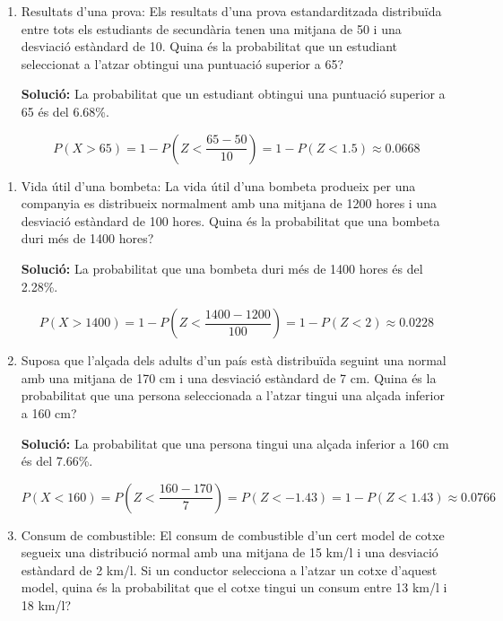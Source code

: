 \documentclass[12pt]{article}
\begin{document}
\begin{exemple} [title=]
\begin{enumerate} [start=19]
    \item Resultats d'una prova: Els resultats d'una prova estandarditzada distribuïda entre tots els estudiants de secundària tenen una mitjana de 50 i una desviació estàndard de 10. Quina és la probabilitat que un estudiant seleccionat a l'atzar obtingui una puntuació superior a 65?
    
    \textbf{Solució:} La probabilitat que un estudiant obtingui una puntuació superior a 65 és del 6.68\%.
    
    \[
    P(X > 65) = 1 - P\left(Z< \frac{65 - 50}{10} \right) = 1 - P(Z< 1.5) \approx 0.0668
    \]
\end{enumerate}
\end{exemple}

\begin{exemple} [title=]

\begin{enumerate} [start=23]

    \item Vida útil d'una bombeta: La vida útil d'una bombeta produeix per una companyia es distribueix normalment amb una mitjana de 1200 hores i una desviació estàndard de 100 hores. Quina és la probabilitat que una bombeta duri més de 1400 hores?
    
    \textbf{Solució:} La probabilitat que una bombeta duri més de 1400 hores és del 2.28\%.
    
    \[
    P(X > 1400) = 1 - P\left(Z< \frac{1400 - 1200}{100} \right) = 1 - P(Z< 2) \approx 0.0228
    \]

    \item Suposa que l'alçada dels adults d'un país està distribuïda seguint una normal amb una mitjana de 170 cm i una desviació estàndard de 7 cm. Quina és la probabilitat que una persona seleccionada a l'atzar tingui una alçada inferior a 160 cm?
    
    \textbf{Solució:} La probabilitat que una persona tingui una alçada inferior a 160 cm és del 7.66\%.
    
    \[
    P(X < 160) = P\left(Z< \frac{160 - 170}{7} \right) = P(Z< -1.43) = 1 - P(Z< 1.43) \approx 0.0766
    \]

    \item Consum de combustible: El consum de combustible d'un cert model de cotxe segueix una distribució normal amb una mitjana de 15 km/l i una desviació estàndard de 2 km/l. Si un conductor selecciona a l'atzar un cotxe d'aquest model, quina és la probabilitat que el cotxe tingui un consum entre 13 km/l i 18 km/l?
    

\end{enumerate}
\end{exemple}
\end{document}
